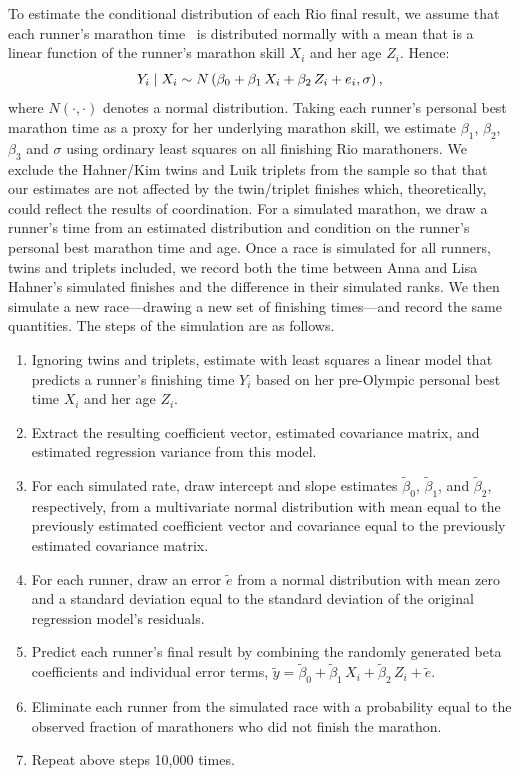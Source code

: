 \documentclass[12pt,titlepage]{article}
\begin{document}
To estimate the conditional distribution of each Rio final result, we
assume that each runner's marathon time \Yi\ is distributed normally
with a mean that is a linear function of the runner's marathon
skill $X_i$ and her age $Z_i$. Hence:
$$Y_i \mid X_i \sim N\left(\beta_0 + \beta_1\,X_{i}  + \beta_2\,Z_{i} + e_i, \sigma\right),$$
where $N\left(\cdot,\cdot\right)$ denotes a normal
distribution. Taking each runner's personal best marathon time as a
proxy for her underlying marathon skill, we estimate $\beta_1$,
$\beta_2$, $\beta_3$ and $\sigma$ using ordinary least squares on all
finishing Rio marathoners.  We exclude the Hahner/Kim twins and Luik
triplets from the sample so that that our estimates are not affected
by the twin/triplet finishes which, theoretically, could reflect the
results of coordination.  For a simulated marathon, we draw a runner's
time from an estimated distribution and condition on the runner's
personal best marathon time and age.  Once a race is simulated for all
runners, twins and triplets included, we record both the time between
Anna and Lisa Hahner's simulated finishes and the difference in their
simulated ranks.  We then simulate a new race---drawing a new set of
finishing times---and record the same quantities. The steps of the
simulation are as follows.
\begin{enumerate}
\item Ignoring twins and triplets, estimate with least squares a
  linear model that predicts a runner's finishing time $Y_i$ based on
  her pre-Olympic personal best time $X_i$ and her age $Z_i$.
\item Extract the resulting coefficient vector, estimated covariance
  matrix, and estimated regression variance from this model.
\item For each simulated rate, draw intercept and slope estimates
  $\tilde{\beta}_0$, $\tilde{\beta}_1$, and
  $\tilde{\beta}_2$, respectively, from a multivariate normal
  distribution with mean equal to the previously estimated coefficient
  vector and covariance equal to the previously estimated covariance
  matrix.
\item For each runner, draw an error $\tilde{e}$ from a normal
  distribution with mean zero and a standard deviation equal to the
  standard deviation of the original regression model's residuals.
\item Predict each runner's final result by combining the randomly
  generated beta coefficients and individual error terms,
  $\tilde{y} = \tilde{\beta}_0 + \tilde{\beta}_1\,X_i +  \tilde{\beta}_2\,Z_i + \tilde{e}$.
\item Eliminate each runner from the simulated race with a probability
  equal to the observed fraction of marathoners who did not finish the
  marathon.
\item Repeat above steps 10,000 times.
\end{enumerate}
\end{document}
